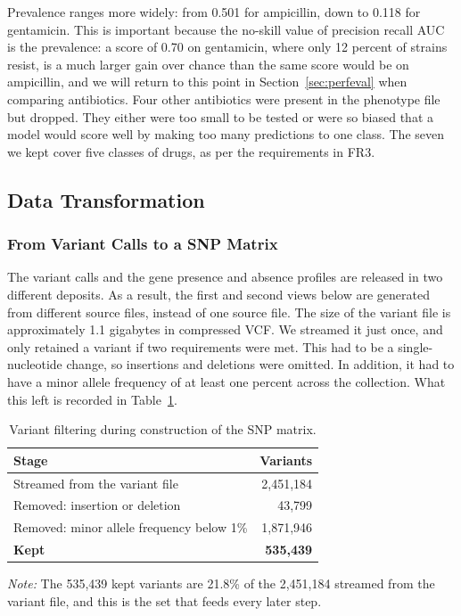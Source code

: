 \vspace{1em}

Prevalence ranges more widely: from 0.501 for ampicillin, down to 0.118 for gentamicin. This
is important because the no-skill value of precision recall AUC is the prevalence: a score of
0.70 on gentamicin, where only 12 percent of strains resist, is a much larger gain over chance
than the same score would be on ampicillin, and we will return to this point in
Section~\ref{sec:perfeval} when comparing antibiotics. Four other antibiotics were present in
the phenotype file but dropped. They either were too small to be tested or were so biased that
a model would score well by making too many predictions to one class. The seven we kept cover
five classes of drugs, as per the requirements in FR3.

\FloatBarrier
\subsection{Data Transformation}

\subsubsection{From Variant Calls to a SNP Matrix}

The variant calls and the gene presence and absence profiles are released in two different
deposits. As a result, the first and second views below are generated from different source
files, instead of one source file. The size of the variant file is approximately 1.1 gigabytes
in compressed VCF. We streamed it
just once, and only retained a variant if two requirements were met. This had to be a
single-nucleotide change, so insertions and deletions were omitted. In addition, it had to
have a minor allele frequency of at least one percent across the collection. What this left is
recorded in Table~\ref{tab:variants}.

\begin{table}[htb]
\centering
\caption{Variant filtering during construction of the SNP matrix.}
\label{tab:variants}
\small
\begin{tabular}{|l|r|}
\hline
\textbf{Stage} & \textbf{Variants} \\
\hline
Streamed from the variant file & 2,451,184 \\ \hline
Removed: insertion or deletion &    43,799 \\ \hline
Removed: minor allele frequency below 1\% & 1,871,946 \\ \hline
\hline
\textbf{Kept} & \textbf{535,439} \\ \hline
\end{tabular}
\vspace{0.4em}

\noindent\footnotesize\textit{Note:} The 535,439 kept variants are 21.8\% of the 2,451,184
streamed from the variant file, and this
is the set that feeds every later step.
\end{table}

